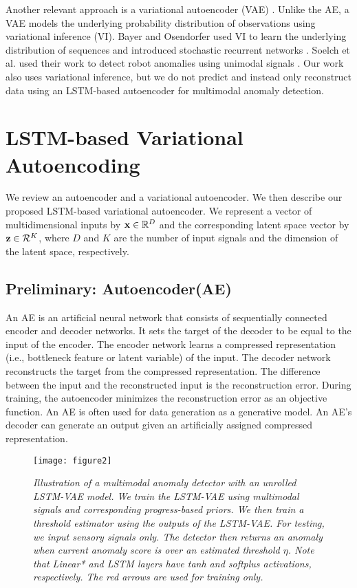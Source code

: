 \documentclass[letterpaper, 10 pt, conference]{ieeeconf}
\newcommand{\vz}{{\bf z}}
\newcommand{\vx}{{\bf x}}
\begin{document}
Another relevant approach is a variational autoencoder (VAE) \cite{kingma2013auto}. Unlike the AE, a VAE models the underlying probability distribution of observations using variational inference (VI). Bayer and Osendorfer used VI to learn the underlying distribution of sequences and introduced stochastic recurrent networks \cite{bayer2014learning}. Soelch et al. used their work to detect robot anomalies using unimodal signals \cite{solch2016variational}. Our work also uses variational inference, but we do not predict and instead only reconstruct data using an LSTM-based autoencoder for multimodal anomaly detection. 



\section{LSTM-based Variational Autoencoding}
We review an autoencoder and a variational autoencoder. We then describe our proposed LSTM-based variational autoencoder. We represent a vector of multidimensional inputs by $\vx \in \mathbb{R}^{D}$ and the corresponding latent space vector by $\vz \in \mathcal{R}^K$, where $D$ and $K$ are the number of input signals and the dimension of the latent space, respectively. 

\subsection{Preliminary: Autoencoder(AE)}
An AE is an artificial neural network that consists of sequentially connected encoder and decoder networks. It sets the target of the decoder to be equal to the input of the encoder. The encoder network learns a compressed representation (i.e., bottleneck feature or latent variable) of the input. The decoder network reconstructs the target from the compressed representation. The difference between the input and the reconstructed input is the reconstruction error. During training, the autoencoder minimizes the reconstruction error as an objective function. An AE is often used for data generation as a generative model. An AE's decoder can generate an output given an artificially assigned compressed representation.

\begin{figure*}[t]
	\centering
    \vspace{8pt}
	\texttt{[image: figure2]} 	
	\caption{\textit{Illustration of a multimodal anomaly detector with an unrolled LSTM-VAE model. We train the LSTM-VAE using multimodal signals and corresponding progress-based priors. We then train a threshold estimator using the outputs of the LSTM-VAE. For testing, we input sensory signals only. The detector then returns an anomaly when current anomaly score is over an estimated threshold $\eta$. Note that Linear* and LSTM layers have tanh and softplus activations, respectively. The red arrows are used for training only.}}
	\label{fig: structure}
    \vspace{-1.0em}
\end{figure*}
\end{document}
